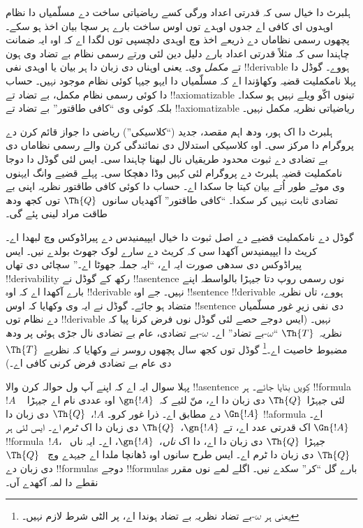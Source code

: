\documentclass[../../../include/open-logic-section]{subfiles}
\begin{document}


ہلبرٹ دا خیال سی کہ قدرتی اعداد ورگی کسے ریاضیاتی ساخت دے
مسلّمیاں دا نظام اوہدوں ای کافی اے جدوں اوہدے توں اوس ساخت
بارے ہر سچا بیان اخذ ہو سکے۔ پچھوں رسمی نظاماں دے ذریعے اخذ وچ
اوہدی دلچسپی توں لگدا اے کہ اوہ ایہ ضمانت چاہندا سی کہ مثلاً
قدرتی اعداد بارے دلیل دین لئی ورتے رسمی نظام بے تضاد وی ہون
تے \emph{مکمل} وی۔ یعنی اوہناں دی زبان دا ہر بیان یا اوہدی نفی
!!{derivable} ہووے۔ گوڈل دا پہلا نامکملیت قضیہ وکھاؤندا اے کہ
مسلّمیاں دا ایہو جیہا کوئی نظام موجود نہیں۔ حساب دا کوئی رسمی
نظام مکمل، بے تضاد تے !!{axiomatizable} تینوں اکّو ویلے نہیں ہو سکدا۔
بلکہ کوئی وی “کافی طاقتور” بے تضاد تے !!{axiomatizable}
ریاضیاتی نظریہ مکمل نہیں۔

ہلبرٹ دا اک ہور، ودھ اہم مقصد، جدید (“کلاسیکی”) ریاضی دا
جواز قائم کرن دے پروگرام دا مرکز سی۔ اوہ کلاسیکی استدلال دی
نمائندگی کرن والے رسمی نظاماں دی بے تضادی دے ثبوت محدود
طریقیاں نال لبھنا چاہندا سی۔ ایس لئی گوڈل دا دوجا نامکملیت
قضیہ ہلبرٹ دے پروگرام لئی کہیں وڈا دھچکا سی۔ پہلے قضیے وانگ
ایہنوں وی موٹے طور اُتے بیان کیتا جا سکدا اے۔ حساب دا کوئی
کافی طاقتور نظریہ اپنی بے تضادی ثابت نہیں کر سکدا۔
“کافی طاقتور” آکھدیاں سانوں~$\Th{Q}$ توں کجھ ودھ طاقت
مراد لینی پئے گی۔

گوڈل دے نامکملیت قضیے دے اصل ثبوت دا خیال ایپیمنیدس دے
پیراڈوکس وچ لبھدا اے۔ کریٹ دا ایپیمنیدس آکھدا سی کہ کریٹ دے
سارے لوک جھوٹ بولدے نیں۔ ایس پیراڈوکس دی سدھی صورت ایہ
اے، “ایہ جملہ جھوٹا اے۔” سچائی دی تھاں !!{derivability} رکھ
کے گوڈل نے !!a{sentence} نوں رسمی روپ دتا جیہڑا بالواسطہ
اپنے بارے آکھدا اے کہ اوہ !!{derivable} نہیں۔ جے اوہ
!!{sentence} !!{derivable} ہووے، تاں نظریہ متضاد ہو جائے۔
گوڈل نے ایہ وی وکھایا کہ اوس !!{sentence} دی نفی زیرِ غور
مسلّمیاں دے نظام توں !!{derivable} نہیں۔ (ایس دوجے حصے لئی
گوڈل نوں فرض کرنا پیا کہ نظریہ~$\Th{T}$ “$\omega$-بے تضاد”
اے۔ $\omega$-بے تضادی، عام بے تضادی نال جڑی ہوئی پر ودھ
مضبوط خاصیت اے۔\footnote{یعنی ہر $\omega$-بے تضاد نظریہ
بے تضاد ہوندا اے، پر الٹی شرط لازم نہیں۔} گوڈل توں کجھ سال
پچھوں روسر نے وکھایا کہ نظریے~$\Th{T}$ دی عام بے تضادی
فرض کرنی کافی اے۔)

پہلا سوال ایہ اے کہ اپنے آپ ول حوالہ کرن والا !!a{sentence}
کِویں بنایا جائے۔ ہر !!{formula}~$!A$ لئی جیہڑا~$\Th{Q}$
دی زبان دا اے، منّ لئیے کہ~$\gn{!A}$ اوہ عددی نام اے جیہڑا
~$\Gn{!A}$ دے مطابق اے۔ ذرا غور کرو۔ $!A$،~$\Th{Q}$
دی زبان دا !!a{formula} اے۔ $\Gn{!A}$ اک قدرتی عدد اے،
تے $\gn{!A}$،~$\Th{Q}$ دی زبان دا اک \emph{ٹرم} اے۔
ایس لئی ہر !!{formula}~$!A$، جیہڑا~$\Th{Q}$ دی زبان دا اے،
دا اک \emph{ناں}،~$\gn{!A}$، اے۔ ایہ ناں~$\Th{Q}$ دی زبان
دا ٹرم اے۔ ایس طرح سانوں اوہ ڈھانچا ملدا اے جیہدے وچ
~$\Th{Q}$ دی زبان دے !!{formula}s دوجے !!{formula}s بارے
گل “کر” سکدے نیں۔ اگلے لمے نوں مقرر نقطے دا لمہ آکھدے آں۔
\end{document}

